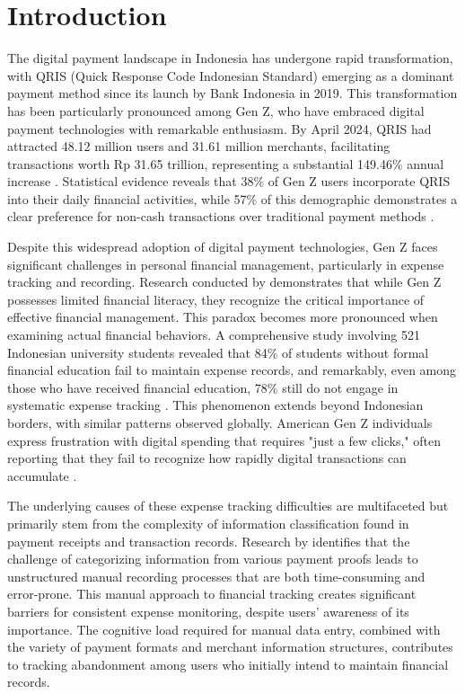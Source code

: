 \section{Introduction}

The digital payment landscape in Indonesia has undergone rapid transformation, with QRIS (Quick Response Code Indonesian Standard) emerging as a dominant payment method since its launch by Bank Indonesia in 2019. This transformation has been particularly pronounced among Gen Z, who have embraced digital payment technologies with remarkable enthusiasm. By April 2024, QRIS had attracted 48.12 million users and 31.61 million merchants, facilitating transactions worth Rp 31.65 trillion, representing a substantial 149.46\% annual increase \cite{CNNqris2024, Tempo2024BIQRIS}. Statistical evidence reveals that 38\% of Gen Z users incorporate QRIS into their daily financial activities, while 57\% of this demographic demonstrates a clear preference for non-cash transactions over traditional payment methods \cite{qris2023goodstats, jawapos2024qris}.

Despite this widespread adoption of digital payment technologies, Gen Z faces significant challenges in personal financial management, particularly in expense tracking and recording. Research conducted by \cite{beck2019managing} demonstrates that while Gen Z possesses limited financial literacy, they recognize the critical importance of effective financial management. This paradox becomes more pronounced when examining actual financial behaviors. A comprehensive study involving 521 Indonesian university students revealed that 84\% of students without formal financial education fail to maintain expense records, and remarkably, even among those who have received financial education, 78\% still do not engage in systematic expense tracking \cite{johan2021effect}. This phenomenon extends beyond Indonesian borders, with similar patterns observed globally. American Gen Z individuals express frustration with digital spending that requires "just a few clicks," often reporting that they fail to recognize how rapidly digital transactions can accumulate \cite{lewis2019follow}.

The underlying causes of these expense tracking difficulties are multifaceted but primarily stem from the complexity of information classification found in payment receipts and transaction records. Research by \cite{kaye2014money} identifies that the challenge of categorizing information from various payment proofs leads to unstructured manual recording processes that are both time-consuming and error-prone. This manual approach to financial tracking creates significant barriers for consistent expense monitoring, despite users' awareness of its importance. The cognitive load required for manual data entry, combined with the variety of payment formats and merchant information structures, contributes to tracking abandonment among users who initially intend to maintain financial records.

